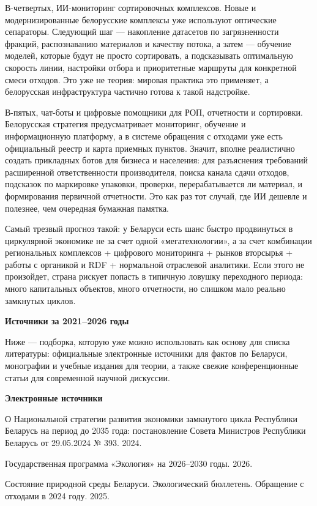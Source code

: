 \documentclass[14pt,a4paper]{extarticle}
\begin{document}
В-четвертых, ИИ-мониторинг сортировочных комплексов. Новые и модернизированные белорусские комплексы уже используют оптические сепараторы. Следующий шаг --- накопление датасетов по загрязненности фракций, распознаванию материалов и качеству потока, а затем --- обучение моделей, которые будут не просто сортировать, а подсказывать оптимальную скорость линии, настройки отбора и приоритетные маршруты для конкретной смеси отходов. Это уже не теория: мировая практика это применяет, а белорусская инфраструктура частично готова к такой надстройке.

В-пятых, чат-боты и цифровые помощники для РОП, отчетности и сортировки. Белорусская стратегия предусматривает мониторинг, обучение и информационную платформу, а в системе обращения с отходами уже есть официальный реестр и карта приемных пунктов. Значит, вполне реалистично создать прикладных ботов для бизнеса и населения: для разъяснения требований расширенной ответственности производителя, поиска канала сдачи отходов, подсказок по маркировке упаковки, проверки, перерабатывается ли материал, и формирования первичной отчетности. Это как раз тот случай, где ИИ дешевле и полезнее, чем очередная бумажная памятка.

Самый трезвый прогноз такой: у Беларуси есть шанс быстро продвинуться в циркулярной экономике не за счет одной «мегатехнологии», а за счет комбинации региональных комплексов + цифрового мониторинга + рынков вторсырья + работы с органикой и RDF + нормальной отраслевой аналитики. Если этого не произойдет, страна рискует попасть в типичную ловушку переходного периода: много капитальных объектов, много отчетности, но слишком мало реально замкнутых циклов.

\textbf{Источники за 2021--2026 годы}

Ниже --- подборка, которую уже можно использовать как основу для списка литературы: официальные электронные источники для фактов по Беларуси, монографии и учебные издания для теории, а также свежие конференционные статьи для современной научной дискуссии.

\textbf{Электронные источники}

О Национальной стратегии развития экономики замкнутого цикла Республики Беларусь на период до 2035 года: постановление Совета Министров Республики Беларусь от 29.05.2024 № 393. 2024.

Государственная программа «Экология» на 2026--2030 годы. 2026.

Состояние природной среды Беларуси. Экологический бюллетень. Обращение с отходами в 2024 году. 2025.
\end{document}
